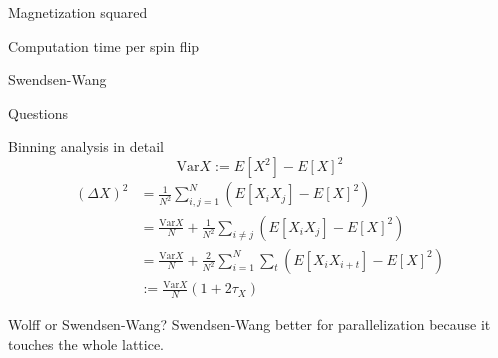 \documentclass[]{beamer}
\begin{document}
\begin{frame}{Magnetization squared}
\end{frame}

\begin{frame}{Computation time per spin flip}
\end{frame}

\begin{frame}{Swendsen-Wang}
\end{frame}


\begin{frame}
\centerline{\huge{Questions}}
\end{frame}

\begin{frame}{Binning analysis in detail}
\[ \text{Var} X := E \left[ X^2 \right] - E \left[ X \right]^2 \]
\begin{align*}
(\Delta X)^2 &= \frac{1}{N^2} \sum\limits_{i,j=1}^N \left( E \left[ X_i X_j \right] - E \left[ X \right]^2 \right) \\
&= \frac{\text{Var}X}{N}+\frac{1}{N^2}\sum\limits_{i\neq j} \left( E \left[X_i X_j \right] - E \left[ X \right]^2 \right) \\
&= \frac{\text{Var}X}{N}+\frac{2}{N^2}\sum\limits_{i=1}^N \sum\limits_t \left( E\left[X_i X_{i+t} \right] - E \left[ X \right]^2 \right) \\
&:= \frac{\text{Var}X}{N}\left(1+2\tau_X\right)
\end{align*}
\end{frame}

\begin{frame}{Wolff or Swendsen-Wang?}
Swendsen-Wang better for parallelization because it touches the whole lattice.
\end{frame}
\end{document}
